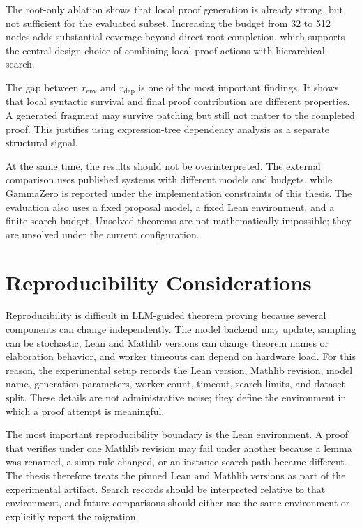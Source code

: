 The root-only ablation shows that local proof generation is already strong, but not sufficient for the
evaluated subset. Increasing the budget from 32 to 512 nodes adds substantial coverage beyond direct
root completion, which supports the central design choice of combining local proof actions with
hierarchical search.

The gap between \(r_{\mathrm{env}}\) and \(r_{\mathrm{dep}}\) is one of the most important findings. It shows that local syntactic survival and final proof contribution are different properties. A generated fragment may survive patching but still not matter to the completed proof. This justifies using expression-tree dependency analysis as a separate structural signal.

At the same time, the results should not be overinterpreted. The external comparison uses published
systems with different models and budgets, while GammaZero is reported under the implementation
constraints of this thesis. The evaluation also
uses a fixed proposal model, a fixed Lean environment, and a finite search budget. Unsolved theorems
are not mathematically impossible; they are unsolved under the current configuration.


\section{Reproducibility Considerations}

Reproducibility is difficult in LLM-guided theorem proving because several components can change
independently. The model backend may update, sampling can be stochastic, Lean and Mathlib versions
can change theorem names or elaboration behavior, and worker timeouts can depend on hardware load.
For this reason, the experimental setup records the Lean version, Mathlib revision, model name, generation
parameters, worker count, timeout, search limits, and dataset split. These details are not administrative
noise; they define the environment in which a proof attempt is meaningful.

The most important reproducibility boundary is the Lean environment. A proof that verifies under one
Mathlib revision may fail under another because a lemma was renamed, a simp rule changed, or an
instance search path became different. The thesis therefore treats the pinned Lean and Mathlib versions
as part of the experimental artifact. Search records should be interpreted relative to that environment,
and future comparisons should either use the same environment or explicitly report the migration.

